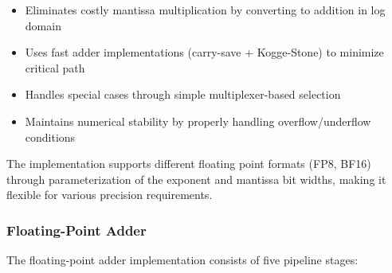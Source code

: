 \documentclass[12pt,letterpaper]{article}
\begin{document}
\begin{itemize}
    \item Eliminates costly mantissa multiplication by converting to addition in log domain
    \item Uses fast adder implementations (carry-save + Kogge-Stone) to minimize critical path
    \item Handles special cases through simple multiplexer-based selection
    \item Maintains numerical stability by properly handling overflow/underflow conditions
\end{itemize}
The implementation supports different floating point formats (FP8, BF16) through parameterization of the exponent and mantissa bit widths, making it flexible for various precision requirements.

 

\subsubsection{Floating-Point Adder}

The floating-point adder implementation consists of five pipeline stages:
\end{document}
